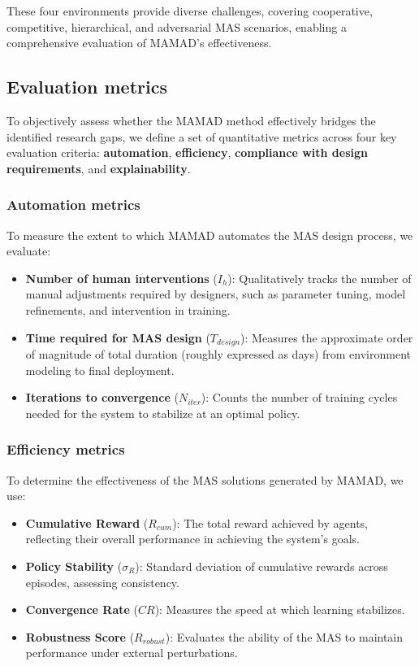 \documentclass[pdflatex,sn-mathphys-num]{sn-jnl}%
\theoremstyle{thmstyleone}%
\theoremstyle{thmstyletwo}%
\theoremstyle{thmstylethree}%
\begin{document}
\noindent These four environments provide diverse challenges, covering cooperative, competitive, hierarchical, and adversarial MAS scenarios, enabling a comprehensive evaluation of MAMAD's effectiveness.


\subsection{Evaluation metrics}

To objectively assess whether the MAMAD method effectively bridges the identified research gaps, we define a set of quantitative metrics across four key evaluation criteria: \textbf{automation}, \textbf{efficiency}, \textbf{compliance with design requirements}, and \textbf{explainability}.

\subsubsection{Automation metrics}
To measure the extent to which MAMAD automates the MAS design process, we evaluate:
\begin{itemize}
    \item \textbf{Number of human interventions} ($I_h$): Qualitatively tracks the number of manual adjustments required by designers, such as parameter tuning, model refinements, and intervention in training.
    \item \textbf{Time required for MAS design} ($T_{design}$): Measures the approximate order of magnitude of total duration (roughly expressed as days) from environment modeling to final deployment.
    \item \textbf{Iterations to convergence} ($N_{iter}$): Counts the number of training cycles needed for the system to stabilize at an optimal policy.
\end{itemize}

\subsubsection{Efficiency metrics}
To determine the effectiveness of the MAS solutions generated by MAMAD, we use:
\begin{itemize}
    \item \textbf{Cumulative Reward} ($R_{cum}$): The total reward achieved by agents, reflecting their overall performance in achieving the system's goals.
    \item \textbf{Policy Stability} ($\sigma_R$): Standard deviation of cumulative rewards across episodes, assessing consistency.
    \item \textbf{Convergence Rate} ($CR$): Measures the speed at which learning stabilizes.
    \item \textbf{Robustness Score} ($R_{robust}$): Evaluates the ability of the MAS to maintain performance under external perturbations.
\end{itemize}
\end{document}
